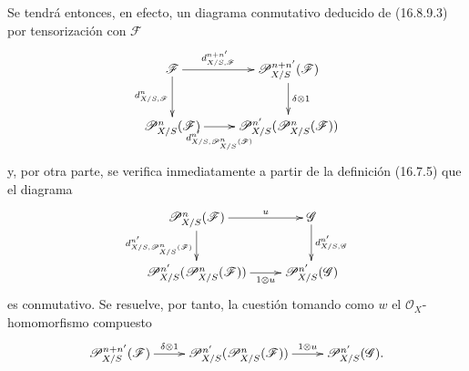 Se tendrá entonces, en efecto, un diagrama conmutativo deducido de (16.8.9.3)
por tensorización con $\mathscr{F}$
\[
  \xymatrix{
    \mathscr{F}\ar[r]^-{d_{X/S,\mathscr{F}}^{n+n'}}
      \ar[d]_-{d_{X/S,\mathscr{F}}^n}
      &\mathscr{P}_{X/S}^{n+n'}(\mathscr{F})
        \ar[d]^-{\delta\otimes1}\\
    \mathscr{P}_{X/S}^n(\mathscr{F})
      \ar[r]_-{d_{X/S,\mathscr{P}_{X/S}^n(\mathscr{F})}^{n'}}
      &\mathscr{P}_{X/S}^{n'}(\mathscr{P}_{X/S}^n(\mathscr{F}))
  }
\]
y, por otra parte, se verifica inmediatamente a partir de la definición
(16.7.5) que el diagrama
\[
  \xymatrix{
    \mathscr{P}_{X/S}^n(\mathscr{F})\ar[r]^-u
      \ar[d]_-{d_{X/S,\mathscr{P}_{X/S}^n(\mathscr{F})}^{n'}}
      &\mathscr{G}\ar[d]^-{d_{X/S,\mathscr{G}}^{n'}}\\
    \mathscr{P}_{X/S}^{n'}(\mathscr{P}_{X/S}^n(\mathscr{F}))
      \ar[r]_-{1\otimes u}
      &\mathscr{P}_{X/S}^{n'}(\mathscr{G})
  }
\]
es conmutativo. Se resuelve, por tanto, la cuestión tomando como $w$ el
$\mathcal{O}_X$-homomorfismo compuesto
\[
  \xymatrix{
    \mathscr{P}_{X/S}^{n+n'}(\mathscr{F})
      \ar[r]^-{\delta\otimes1}
      &\mathscr{P}_{X/S}^{n'}(\mathscr{P}_{X/S}^n(\mathscr{F}))
        \ar[r]^-{1\otimes u}
      &\mathscr{P}_{X/S}^{n'}(\mathscr{G}).
  }
\]

